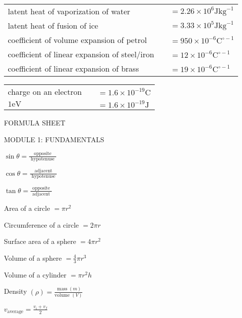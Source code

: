 \documentclass{extarticle}
\begin{document}
\begin{tabularx}{\textwidth}{Xr@{}l}

latent heat of vaporization of water & & $=2.26 \times 10^{6} \mathrm{J} \mathrm{kg}^{-1}$ \\
latent heat of fusion of ice & & $=3.33 \times 10^{5} \mathrm{J} \mathrm{kg}^{-1}$ \\
coefficient of volume expansion of petrol & & $=950 \times 10^{-6} \mathrm{C}^{\circ-1}$ \\
coefficient of linear expansion of steel/iron & & $=12 \times 10^{-6} \mathrm{C}^{\circ-1}$ \\
coefficient of linear expansion of brass & & $=19 \times 10^{-6} \mathrm{C}^{\circ-1}$ \\

\end{tabularx}

\begin{tabularx}{\textwidth}{Xr@{}l}

charge on an electron & & $=1.6 \times 10^{-19} \mathrm{C}$ \\
$1 \mathrm{eV}$ & & $=1.6 \times 10^{-19} \mathrm{J}$ \\

\end{tabularx}


\markEnd



FORMULA SHEET

MODULE 1: FUNDAMENTALS
\markStart[25]

$\sin \theta=\frac{\text { opposite }}{\text { hypotenuse }}$

$\cos \theta=\frac{\text { adjacent }}{\text { hypotenuse }}$

$\tan \theta=\frac{\text { opposite }}{\text { adjacent }}$

\markEnd

\markStart[100]


Area of a circle $=\pi r^{2}$

Circumference of a circle $=2 \pi r$

Surface area of a sphere $=4 \pi r^{2} \quad$

Volume of a sphere $=\frac{4}{3} \pi r^{3}$

Volume of a cylinder $=\pi r^{2} h \quad$

Density $(\rho)=\frac{\operatorname{mass}(m)}{\text {volume }(V)}$

$v_{\text {average}}=\frac{v_{i}+v_{f}}{2}$
\end{document}
